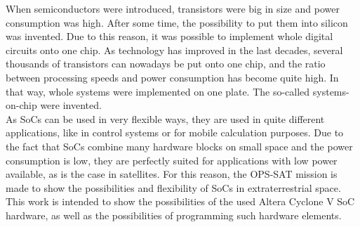 When semiconductors were introduced, transistors were big in size and power consumption was high. After some time, the possibility to put them into silicon was invented. Due to this reason, it was possible to implement whole digital circuits onto one chip. As technology has improved in the last decades, several thousands of transistors can nowadays be put onto one chip, and the ratio between processing speeds and power consumption has become quite high. In that way, whole systems were implemented on one plate. The so-called systems-on-chip were invented.\\
As SoCs can be used in very flexible ways, they are used in quite different applications, like in control systems or for mobile calculation purposes. Due to the fact that SoCs combine many hardware blocks on small space and the power consumption is low, they are perfectly suited for applications with low power available, as is the case in satellites. For this reason, the OPS-SAT mission is made to show the possibilities and flexibility of SoCs in extraterrestrial space.\\
This work is intended to show the possibilities of the used Altera Cyclone V SoC hardware, as well as the possibilities of programming such hardware elements.